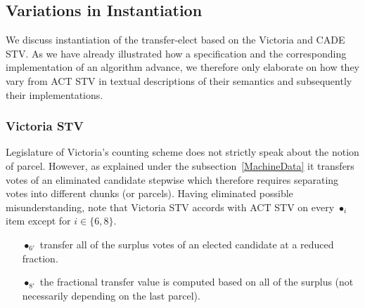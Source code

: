 \documentclass[10pt,conference]{IEEEtran}
\begin{document}
\subsection{Variations in Instantiation}
We discuss instantiation of the transfer-elect  based on the Victoria and CADE STV. As we have already illustrated how a specification and the corresponding implementation of an algorithm advance, we therefore only elaborate on how they vary from ACT STV in textual descriptions of their semantics and subsequently their implementations. 
\subsubsection{Victoria STV}
Legislature of Victoria's counting scheme does not strictly speak about the notion of parcel. However, as explained under the subsection~\ref{MachineData} it transfers votes of an eliminated candidate stepwise which therefore requires separating votes into different chunks (or parcels). Having eliminated possible misunderstanding, note that Victoria STV accords with ACT STV  on every $\bullet_{i}$ item except for $i\in\{6,8\}$.
\begin{itemize}
\item[$\bullet_{6'}$] transfer all of the surplus votes of an elected candidate at a reduced fraction.
\item[$\bullet_{8'}$] the fractional transfer value is computed based on all of the surplus (not necessarily depending on the last parcel).
\end{itemize} 
\end{document}
